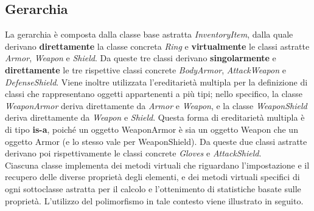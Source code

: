 \subsection{Gerarchia}
La gerarchia è composta dalla classe base astratta \textit{InventoryItem}, dalla quale derivano \textbf{direttamente} la classe concreta \textit{Ring} e \textbf{virtualmente} le classi astratte \textit{Armor}, \textit{Weapon} e \textit{Shield}. Da queste tre classi derivano \textbf{singolarmente} e \textbf{direttamente} le tre rispettive classi concrete \textit{BodyArmor}, \textit{AttackWeapon} e \textit{DefenseShield}. Viene inoltre utilizzata l'ereditarietà multipla per la definizione di classi che rappresentano oggetti appartenenti a più tipi; nello specifico, la classe \textit{WeaponArmor} deriva direttamente da \textit{Armor} e \textit{Weapon}, e la classe \textit{WeaponShield} deriva direttamente da \textit{Weapon} e \textit{Shield}. Questa forma di ereditarietà multipla è di tipo \textbf{is-a}, poiché un oggetto WeaponArmor è sia un oggetto Weapon che un oggetto Armor (e lo stesso vale per WeaponShield). Da queste due classi astratte derivano poi rispettivamente le classi concrete \textit{Gloves} e \textit{AttackShield}. \\
Ciascuna classe implementa dei metodi virtuali che riguardano l'impostazione e il recupero delle diverse proprietà degli elementi, e dei metodi virtuali specifici di ogni sottoclasse astratta per il calcolo e l'ottenimento di statistiche basate sulle proprietà. L'utilizzo del polimorfismo in tale contesto viene illustrato in seguito.

